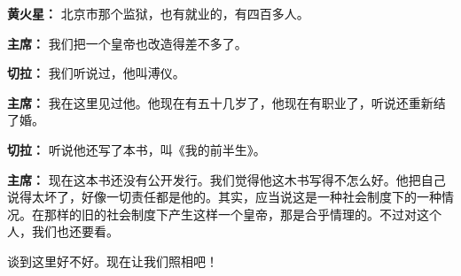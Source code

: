 \begin{duihua}
\item[\textbf{黄火星：}] 北京市那个监狱，也有就业的，有四百多人。

\item[\textbf{主席：}] 我们把一个皇帝也改造得差不多了。

\item[\textbf{切拉：}] 我们听说过，他叫溥仪。

\item[\textbf{主席：}] 我在这里见过他。他现在有五十几岁了，他现在有职业了，听说还重新结了婚。

\item[\textbf{切拉：}] 听说他还写了本书，叫《我的前半生》。

\item[\textbf{主席：}] 现在这本书还没有公开发行。我们觉得他这木书写得不怎么好。他把自己说得太坏了，好像一切责任都是他的。其实，应当说这是一种社会制度下的一种情况。在那样的旧的社会制度下产生这样一个皇帝，那是合乎情理的。不过对这个人，我们也还要看。

谈到这里好不好。现在让我们照相吧！
\end{duihua}
